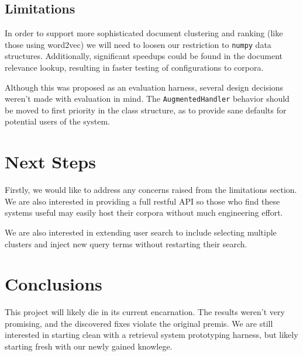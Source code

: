 \documentclass[11pt]{article}
\def\np{\texttt{numpy}\xspace}
\begin{document}
\subsection{Limitations}
In order to support more sophisticated document clustering and ranking (like those using
word2vec) we will need to loosen our restriction to \np data structures. Additionally,
significant speedups could be found in the document relevance lookup, resulting in faster
testing of configurations to corpora.

Although this was proposed as an evaluation harness, several design decisions weren't made
with evaluation in mind. The \texttt{AugmentedHandler} behavior should be moved to first
priority in the class structure, as to provide sane defaults for potential users of the
system.

\section{Next Steps}
Firstly, we would like to address any concerns raised from the limitations section. We
are also interested in providing a full restful API so those who find these systems useful
may easily host their corpora without much engineering effort.

We are also interested in extending user search to include selecting multiple clusters and
inject new query terms without restarting their search.

\section{Conclusions}
This project will likely die in its current encarnation. The results weren't very promising,
and the discovered fixes violate the original premis. We are still interested in starting
clean with a retrieval system prototyping harness, but likely starting fresh with our newly
gained knowlege.




\end{document}
